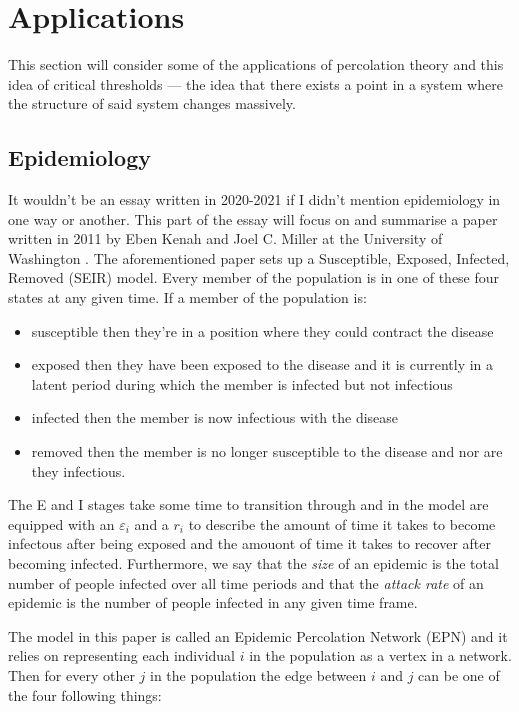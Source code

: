 \section{Applications}
This section will consider some of the applications of percolation theory and this idea of critical thresholds --- the idea that there exists a point in a system where the
structure of said system changes massively.

\subsection{Epidemiology}
It wouldn't be an essay written in 2020-2021 if I didn't mention epidemiology in one way or another. This part of the essay will focus on and summarise a paper written in 2011 by Eben Kenah and
Joel C. Miller at the University of Washington \cite{Kenah}. The aforementioned paper sets up a Susceptible, Exposed, Infected, Removed (SEIR) model. Every member of the population
is in one of these four states at any given time. If a member of the population is:

\begin{itemize}
  \item susceptible then they're in a position where they could contract the disease
  \item exposed then they have been exposed to the disease and it is currently in a latent period during which the member is infected but not infectious
  \item infected then the member is now infectious with the disease
  \item removed then the member is no longer susceptible to the disease and nor are they infectious.
\end{itemize}

The E and I stages take some time to transition through and in the model are equipped with an $\varepsilon_i$ and a $r_i$ to describe the amount of time it takes to become infectous
after being exposed and the amouont of time it takes to recover after becoming infected. Furthermore, we say that the \textit{size} of an epidemic is the total number of people
infected over all time periods and that the \textit{attack rate} of an epidemic is the number of people infected in any given time frame.

The model in this paper is called an Epidemic Percolation Network (EPN) and it relies on representing each individual $i$ in the population as a vertex in a
network. Then for every other $j$ in the population the edge between $i$ and $j$ can be one of the four following things:

